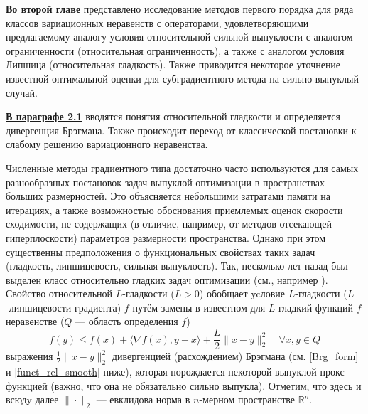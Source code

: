 \begin{table}[h]
\caption{Сравнение характеристик методов}
\label{tabular:timesandtenses}
\centering
{}
\end{table}

\underline{\textbf{Во второй главе}} представлено исследование методов первого порядка для ряда классов вариационных неравенств с операторами, удовлетворяющими предлагаемому аналогу условия относительной сильной выпуклости с аналогом ограниченности (относительная ограниченность), а также с аналогом условия Липшица (относительная гладкость). Также приводится некоторое уточнение известной оптимальной оценки для субградиентного метода \cite{Bach_2012} на сильно-выпуклый случай. 

\underline{\textbf{В параграфе 2.1}} вводятся понятия относительной гладкости и определяется дивергенция Брэгмана. Также происходит переход от классической постановки к слабому решению вариационного неравенства. 

Численные методы градиентного типа достаточно часто используются для самых разнообразных постановок задач выпуклой оптимизации в пространствах больших размерностей. Это объясняется небольшими затратами памяти на итерациях, а также возможностью обоснования приемлемых оценок скорости сходимости, не содержащих (в отличие, например, от методов отсекающей гиперплоскости) параметров размерности пространства. Однако при этом существенны предположения о функциональных свойствах таких задач (гладкость, липшицевость, сильная выпуклость). Так, несколько лет назад был выделен класс относительно гладких задач оптимизации (см., например \cite{Bauschke,Drag,Lu_Nesterov_2018}). Свойство относительной $L$-гладкости ($L > 0$) обобщает ycловие $L$-гладкости ($L$-липшицевости градиента)  $f$ путём замены в известном для $L$-гладкий фyнкций $f$ неравенстве ($Q$ --- область определения $f$)
$$
    f(y) \leq f(x) + \langle \nabla{f(x)}, y - x \rangle  + \frac{L}{2} \|x - y \|_2^2 \quad   \forall x, y \in Q
$$	
выражения $\frac{1}{2} \|x - y \|_2^2 $ дивергенцией (расхождением) Брэгмана (см. \eqref{Brg_form} и \eqref{funct_rel_smooth} ниже), которая порождается некоторой выпуклой прокс-функцией (важно, что она не обязательно сильно выпукла). Отметим, что здесь и всюдy далее $\|\cdot\|_2$ --- евклидова норма в $n$-мерном пространстве $\mathbb{R}^n$.

